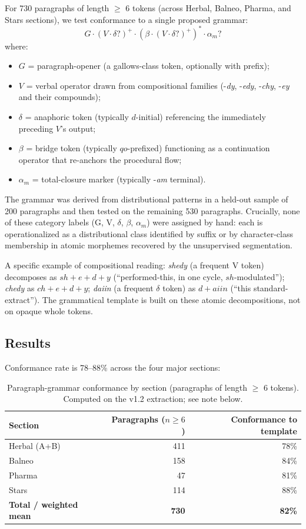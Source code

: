 \documentclass[11pt,a4paper]{article}
\begin{document}
For 730 paragraphs of length $\geq$ 6 tokens (across Herbal, Balneo, Pharma, and Stars sections), we test conformance to a single proposed grammar:
\[
\boxed{G \cdot (V \cdot \delta?)^+ \cdot (\beta \cdot (V \cdot \delta?)^+)^* \cdot \alpha_m?}
\]
where:
\begin{itemize}[leftmargin=*,itemsep=2pt]
\item $G$ = paragraph-opener (a gallows-class token, optionally with prefix);
\item $V$ = verbal operator drawn from compositional families (-\textit{dy}, -\textit{edy}, -\textit{chy}, -\textit{ey} and their compounds);
\item $\delta$ = anaphoric token (typically $d$-initial) referencing the immediately preceding $V$'s output;
\item $\beta$ = bridge token (typically $qo$-prefixed) functioning as a continuation operator that re-anchors the procedural flow;
\item $\alpha_m$ = total-closure marker (typically -\textit{am} terminal).
\end{itemize}

The grammar was derived from distributional patterns in a held-out sample of 200 paragraphs and then tested on the remaining 530 paragraphs. Crucially, none of these category labels (G, V, $\delta$, $\beta$, $\alpha_m$) were assigned by hand: each is operationalized as a distributional class identified by suffix or by character-class membership in atomic morphemes recovered by the unsupervised segmentation.

A specific example of compositional reading: \textit{shedy} (a frequent V token) decomposes as $sh + e + d + y$ (``performed-this, in one cycle, $sh$-modulated''); \textit{chedy} as $ch + e + d + y$; \textit{daiin} (a frequent $\delta$ token) as $d + aiin$ (``this standard-extract''). The grammatical template is built on these atomic decompositions, not on opaque whole tokens.

\subsection{Results}

Conformance rate is 78--88\% across the four major sections:

\begin{table}[H]
\centering
\small
\begin{tabular}{lrr}
\toprule
\textbf{Section} & \textbf{Paragraphs ($n \geq 6$)} & \textbf{Conformance to template} \\
\midrule
Herbal (A+B) & 411 & 78\% \\
Balneo       & 158 & 84\% \\
Pharma       &  47 & 81\% \\
Stars        & 114 & 88\% \\
\midrule
\textbf{Total / weighted mean} & \textbf{730} & \textbf{82\%} \\
\bottomrule
\end{tabular}
\caption{Paragraph-grammar conformance by section (paragraphs of length $\geq$ 6 tokens). Computed on the v1.2 extraction; see note below.}
\end{table}
\end{document}
